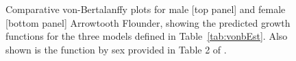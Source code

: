 \begin{figure}[htp]
\captionsetup[subfigure]{labelformat=empty}
\begin{center}
\newline
{}
\end{center}
\caption{Comparative von-Bertalanffy plots for male [top panel] and female [bottom panel] Arrowtooth Flounder, showing the predicted growth functions for the three models defined in Table~\ref{tab:vonbEst}.  Also shown is the function by sex provided in Table 2 of \citet{arf2001}.}
\label{fig:vonbCompare}
\end{figure}

